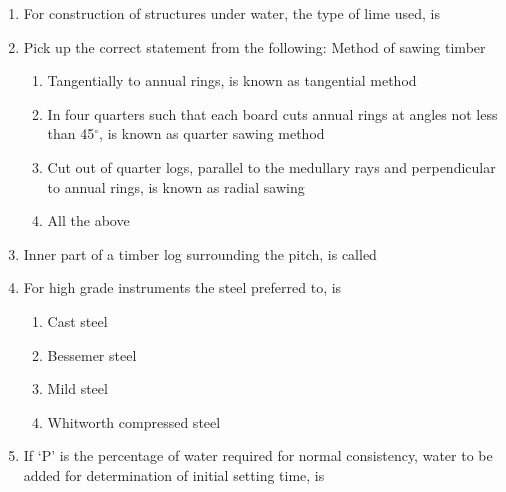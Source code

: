 \documentclass[11pt,a4paper]{article}
\begin{document}
\begin{enumerate}
\item{For construction of structures under water, the type of lime used, is}
\\
\item{Pick up the correct statement from the following: Method of sawing timber}
\begin{enumerate}[label=\Alph*.]
\item{Tangentially to annual rings, is known as tangential method}
\item{In four quarters such that each board cuts annual rings at angles not less than 45$^\circ$, is known as quarter sawing method}
\item{Cut out of quarter logs, parallel to the medullary rays and perpendicular to annual rings, is known as radial sawing}
\item{All the above}
\end{enumerate}
\item{Inner part of a timber log surrounding the pitch, is called}
\\
\item{For high grade instruments the steel preferred to, is}
\begin{enumerate}[label=\Alph*.]
\item{Cast steel}
\item{Bessemer steel}
\item{Mild steel}
\item{Whitworth compressed steel}
\end{enumerate}
\item{If `P' is the percentage of water required for normal consistency, water to be added for determination of initial setting time, is
}
\end{enumerate}
\end{document}
